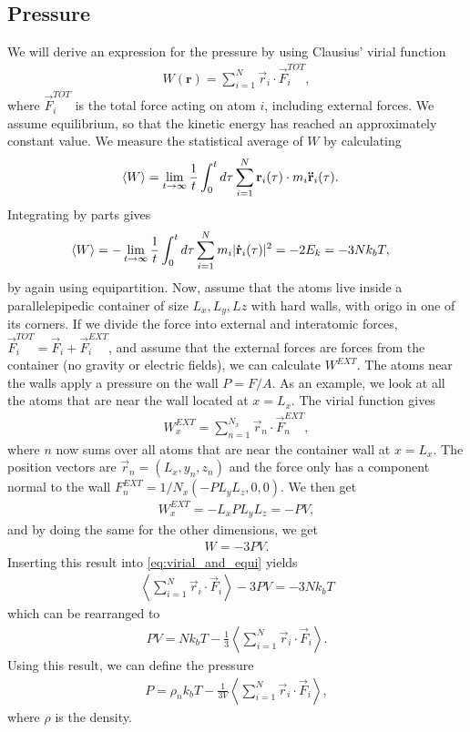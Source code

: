 \subsection{Pressure}
We will derive an expression for the pressure by using Clausius' virial function
\begin{align}
    W(\textbf{r}) = \sum_{i=1}^N \vec r_i \cdot \vec F_i^{TOT},
\end{align}
where $\vec F_i^{TOT}$ is the total force acting on atom $i$, including external forces. We assume equilibrium, so that the kinetic energy has reached an approximately constant value. We measure the statistical average of $W$ by calculating
\begin{align}
    \langle W \rangle &= \lim_{t\rightarrow\infty} {1\over t} \int_0^t d\tau \sum_{i=1}^N \vec r_i(\tau) \cdot m_i \vec{\ddot r}_i(\tau).
\end{align}
Integrating by parts gives
\begin{align}
    \label{eq:virial_and_equi}
    \langle W \rangle &= -\lim_{t\rightarrow\infty} {1\over t} \int_0^t d\tau \sum_{i=1}^N m_i |\vec{\dot r}_i(\tau)|^2 = -2E_k = -3Nk_bT,
\end{align}
by again using equipartition. Now, assume that the atoms live inside a parallelepipedic container of size $L_x, L_y, Lz$ with hard walls, with origo in one of its corners. If we divide the force into external and interatomic forces, $\vec F_i^{TOT} = \vec F_i + \vec F_i^{EXT}$, and assume that the external forces are forces from the container (no gravity or electric fields), we can calculate $W^{EXT}$. The atoms near the walls apply a pressure on the wall $P = F/A$. As an example, we look at all the atoms that are near the wall located at $x=L_x$. The virial function gives
\begin{align}
    W^{EXT}_x = \sum_{n=1}^{N_x}\vec r_n\cdot \vec F_n^{EXT},
\end{align}
where $n$ now sums over all atoms that are near the container wall at $x=L_x$. The position vectors are $\vec r_n = (L_x, y_n, z_n)$ and the force only has a component normal to the wall $F_n^{EXT} = 1/N_x(-PL_yL_z, 0, 0)$. We then get
\begin{align}
    W^{EXT}_x = -L_xPL_yL_z = -PV,
\end{align}
and by doing the same for the other dimensions, we get
\begin{align}
    W = -3PV.
\end{align}
Inserting this result into \eqref{eq:virial_and_equi} yields
\begin{align}
    \left\langle \sum_{i=1}^N \vec r_i \cdot \vec F_i\right\rangle - 3PV = -3Nk_bT
\end{align}
which can be rearranged to
\begin{align}
    PV = Nk_bT - \frac{1}{3}\left\langle \sum_{i=1}^N \vec r_i \cdot \vec F_i\right\rangle.
\end{align}
Using this result, we can define the pressure
\begin{align}
    \label{eq:pressure_in_md}
	P = \rho_n k_bT - \frac{1}{3V}\left\langle \sum_{i=1}^N \vec r_i \cdot \vec F_i\right\rangle,
\end{align}
where $\rho$ is the density.
